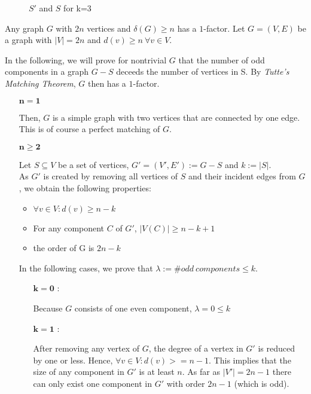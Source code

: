 \documentclass[a4paper]{article}
\begin{document}
\begin{solution}{11}
\begin{figure}[h]
		\caption{$S'$ and $S$ for k=3}
		\end{figure}
	\end{solution}
	\newpage
	\begin{solution}{12}
		\begin{theorem}{Any graph $G$ with $2n$ vertices and $\delta(G) \geq n$ has a $1$-factor.}
			Let $G=(V,E)$ be a graph with $|V| = 2n$ and $d(v) \geq n \: \forall v \in V$.

			In the following, we will prove for nontrivial $G$ that the number of odd components in a graph $G - S$ deceeds the number of vertices in S. By \emph{Tutte's Matching Theorem}, $G$ then has a $1$-factor.
			\begin{itemize}
				\item [$\mathbf{n = 1}$]

					Then, $G$ is a simple graph with two vertices that are connected by one edge. This is of course a perfect matching of $G$.
			
				\item [$\mathbf{n \geq 2}$]

					Let $S \subseteq V$ be a set of vertices, $G' = (V', E') := G - S$ and $k := |S|$.\\
					As $G'$ is created by removing all vertices of $S$ and their incident edges from $G$, we obtain the following properties: 
					\begin{itemize}
						\item $\forall v \in V: d(v) \geq n - k$
						\item For any component $C$ of $G'$, $|V(C)| \geq n-k+1$
						\item the order of G is $2n-k$
					\end{itemize}
					
					In the following cases, we prove that $\lambda:=\#odd\ components \leq k$.
					\begin{itemize}
						\item[$\mathbf{k=0}$]:

							Because $G$ consists of one even component, $\lambda=0 \leq k$
						\item[$\mathbf{k=1}$]:

							After removing any vertex of $G$, the degree of a vertex in $G'$ is reduced by one or less. Hence, $\forall v \in V: d(v) >= n-1$. This implies that the size of any component in $G'$ is at least $n$. As far as $|V'|=2n-1$ there can only exist one component in $G'$ with order $2n-1$ (which is odd).


\end{itemize}
\end{itemize}
\end{theorem}
\end{solution}
\end{document}
